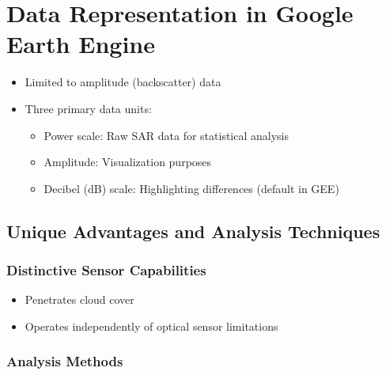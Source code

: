 \documentclass[
  letterpaper,
]{scrbook}
\providecommand{\tightlist}{%
  \setlength{\itemsep}{0pt}\setlength{\parskip}{0pt}}\usepackage{longtable,booktabs,array}
\begin{document}
\section{Data Representation in Google Earth
Engine}\label{data-representation-in-google-earth-engine}

\begin{itemize}
\item
  Limited to amplitude (backscatter) data
\item
  Three primary data units:

  \begin{itemize}
  \item
    Power scale: Raw SAR data for statistical analysis
  \item
    Amplitude: Visualization purposes
  \item
    Decibel (dB) scale: Highlighting differences (default in GEE)
  \end{itemize}
\end{itemize}

\subsection{Unique Advantages and Analysis
Techniques}\label{unique-advantages-and-analysis-techniques}

\subsubsection{Distinctive Sensor
Capabilities}\label{distinctive-sensor-capabilities}

\begin{itemize}
\tightlist
\item
  Penetrates cloud cover
\item
  Operates independently of optical sensor limitations
\end{itemize}

\subsubsection{Analysis Methods}\label{analysis-methods}
\end{document}
